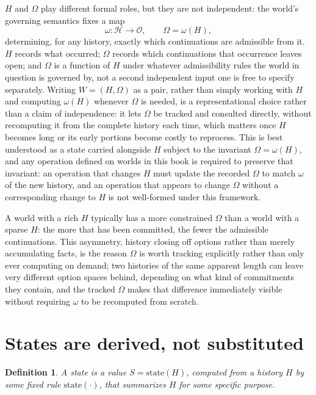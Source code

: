 \documentclass[11pt]{book}
\newtheorem{definition}[theorem]{Definition}
\begin{document}
$H$ and $\Omega$ play different formal roles, but they are not independent: the world's governing semantics fixes a map
\[
\omega:\mathcal H \to \mathcal O, \qquad \Omega = \omega(H),
\]
determining, for any history, exactly which continuations are admissible from it. $H$ records what occurred; $\Omega$ records which continuations that occurrence leaves open; and $\Omega$ is a function of $H$ under whatever admissibility rules the world in question is governed by, not a second independent input one is free to specify separately. Writing $W=(H,\Omega)$ as a pair, rather than simply working with $H$ and computing $\omega(H)$ whenever $\Omega$ is needed, is a representational choice rather than a claim of independence: it lets $\Omega$ be tracked and consulted directly, without recomputing it from the complete history each time, which matters once $H$ becomes long or its early portions become costly to reprocess. This is best understood as a state carried alongside $H$ subject to the invariant $\Omega=\omega(H)$, and any operation defined on worlds in this book is required to preserve that invariant: an operation that changes $H$ must update the recorded $\Omega$ to match $\omega$ of the new history, and an operation that appears to change $\Omega$ without a corresponding change to $H$ is not well-formed under this framework.

A world with a rich $H$ typically has a more constrained $\Omega$ than a world with a sparse $H$: the more that has been committed, the fewer the admissible continuations. This asymmetry, history closing off options rather than merely accumulating facts, is the reason $\Omega$ is worth tracking explicitly rather than only ever computing on demand; two histories of the same apparent length can leave very different option spaces behind, depending on what kind of commitments they contain, and the tracked $\Omega$ makes that difference immediately visible without requiring $\omega$ to be recomputed from scratch.

\section{States are derived, not substituted}

\begin{definition}
A \emph{state} is a value $S=\mathrm{state}(H)$, computed from a history $H$ by some fixed rule $\mathrm{state}(\cdot)$, that summarizes $H$ for some specific purpose.
\end{definition}
\end{document}
